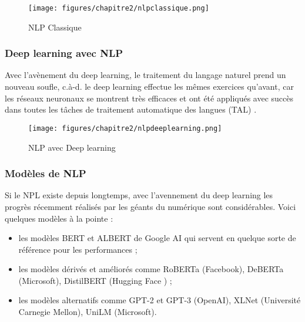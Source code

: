         \begin{figure}[H]
        	\begin{center}
        		\texttt{[image: figures/chapitre2/nlpclassique.png]}
        	\end{center}
        	\caption {NLP Classique}
        	\label{fig:fig6ch2}
        \end{figure}     
        
        \subsubsection{Deep learning avec NLP}
        \par Avec l'avènement du deep learning, le traitement du langage naturel prend un nouveau soufle, c.à-d. le deep learning effectue les mêmes exercices qu'avant, car les réseaux neuronaux se montrent très efficaces et ont été appliqués avec succès dans toutes les tâches de traitement automatique des langues (TAL) \cite{ch2ref5}.  
        
        \begin{figure}[H]
        	\begin{center}
        		\texttt{[image: figures/chapitre2/nlpdeeplearning.png]}
        	\end{center}
        	\caption {NLP avec Deep learning}
        	\label{fig:fig7ch2}
        \end{figure} 
        \subsubsection{Modèles de NLP}
        \par Si le NPL existe depuis longtemps, avec l'avennement du deep learning les progrès récemment réalisés par les géants du numérique sont considérables. Voici quelques modèles à la pointe : \cite{ch2ref11}
        
            \begin{itemize}[label=•] 
            \setlength{\itemsep}{5pt}
                \item les modèles BERT\cite{ch2bert} et ALBERT de Google AI qui servent en quelque sorte de référence pour les performances ;
                \item les modèles dérivés et améliorés comme RoBERTa (Facebook), DeBERTa (Microsoft), DistilBERT (Hugging Face \cite{transformer}) ;
                \item les modèles alternatifs comme GPT-2 et GPT-3 (OpenAI), XLNet (Université Carnegie Mellon), UniLM (Microsoft).
            \end{itemize}
        
